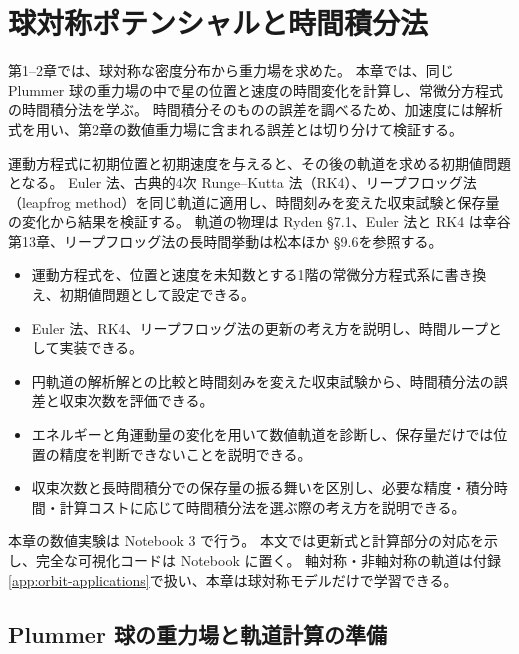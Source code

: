\chapter{球対称ポテンシャルと時間積分法}
\label{chap:orbits}

第1--2章では、球対称な密度分布から重力場を求めた。
本章では、同じ Plummer 球の重力場の中で星の位置と速度の時間変化を計算し、常微分方程式の時間積分法を学ぶ。
時間積分そのものの誤差を調べるため、加速度には解析式を用い、第2章の数値重力場に含まれる誤差とは切り分けて検証する。

運動方程式に初期位置と初期速度を与えると、その後の軌道を求める初期値問題となる。
Euler 法、古典的4次 Runge--Kutta 法（RK4）、リープフロッグ法（leapfrog method）を同じ軌道に適用し、時間刻みを変えた収束試験と保存量の変化から結果を検証する。
軌道の物理は Ryden §7.1\cite{ryden2025}、Euler 法と RK4 は幸谷 第13章\cite{kouya2021}、リープフロッグ法の長時間挙動は松本ほか §9.6\cite{matsumoto}を参照する。

\begin{learningbox}[本章で学ぶこと]
\begin{itemize}
 \item 運動方程式を、位置と速度を未知数とする1階の常微分方程式系に書き換え、初期値問題として設定できる。
 \item Euler 法、RK4、リープフロッグ法の更新の考え方を説明し、時間ループとして実装できる。
 \item 円軌道の解析解との比較と時間刻みを変えた収束試験から、時間積分法の誤差と収束次数を評価できる。
 \item エネルギーと角運動量の変化を用いて数値軌道を診断し、保存量だけでは位置の精度を判断できないことを説明できる。
 \item 収束次数と長時間積分での保存量の振る舞いを区別し、必要な精度・積分時間・計算コストに応じて時間積分法を選ぶ際の考え方を説明できる。
\end{itemize}
\end{learningbox}

本章の数値実験は Notebook 3 で行う。
本文では更新式と計算部分の対応を示し、完全な可視化コードは Notebook に置く。
軸対称・非軸対称の軌道は付録\ref{app:orbit-applications}で扱い、本章は球対称モデルだけで学習できる。
\section{Plummer 球の重力場と軌道計算の準備}
\label{sec:ch3-plummer}

